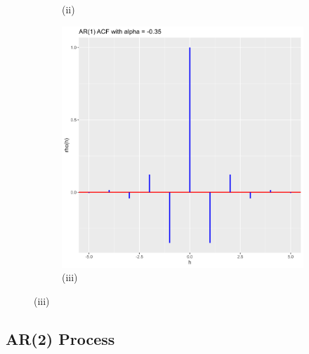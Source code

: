 \documentclass[11pt, a4paper]{article}
\begin{document}
\begin{figure}[h!]
\begin{subfigure}[t]{0.3\textwidth}
	\caption*{(ii)}
  \end{subfigure}
  \hfill
  \begin{subfigure}[t]{0.3\textwidth}
    \includegraphics[width=\linewidth]{alpha_negative_0.35.png}
    \caption*{(iii)}
  \end{subfigure}
\end{figure}

\subsection{AR(2) Process}
\end{document}
